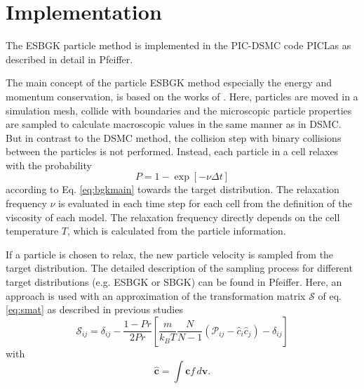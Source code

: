 \documentclass[aip,pof,amsmath,amssymb,preprint]{revtex4-1}
\begin{document}
\section{Implementation}
The ESBGK particle method is implemented in the PIC-DSMC code PICLas \cite[]{Munz2014} as described in detail in Pfeiffer\cite{Pfeiffer2018}. 

The main concept of the particle ESBGK method especially the energy and momentum conservation, is based on the works of 
\cite{gallis2011investigation,gallis2000application,burt2006evaluation,tumuklu2016particle}. 
Here, particles are moved in a simulation mesh,
collide with boundaries and the microscopic particle properties are sampled to calculate macroscopic values in the same manner as in 
DSMC. But in contrast to the DSMC method, the collision step with binary collisions between the particles is not performed. Instead,
each particle in a cell relaxes with the probability
\begin{equation}
P=1-\exp\left[-\nu \Delta t\right]
\label{eq:bgkrelax}
\end{equation}
according to Eq. \eqref{eq:bgkmain} towards the target distribution. The relaxation frequency $\nu$ is evaluated in each time step for each
cell from the definition of the viscosity of each model. The relaxation frequency directly depends on the cell temperature $T$, which
is calculated from the particle information. 

If a particle is chosen to relax, the new particle velocity is sampled from the target distribution. 
The detailed description of the sampling process for different target distributions (e.g. ESBGK or SBGK) can be found in Pfeiffer\cite{Pfeiffer2018}.
Here, an approach is used with 
an approximation of the transformation matrix $\mathcal S$ of eq. \eqref{eq:smat} as described 
in previous studies \cite{gallis2011investigation, burt2006evaluation,tumuklu2016particle}
\begin{equation}
\mathcal S_{ij} = \delta_{ij}-\frac{1-Pr}{2Pr}\left[\frac{m}{k_B T}\frac{N}{N-1}\left(\mathcal P_{ij}-{\hat{c}_i}{\hat{c}_j}\right)-\delta_{ij}\right]
\label{eq:Sconvert}
\end{equation}
with 
\begin{equation}
\mathbf{\hat{c}} = \int \mathbf c f\,d\mathbf v.
\end{equation}
\end{document}
